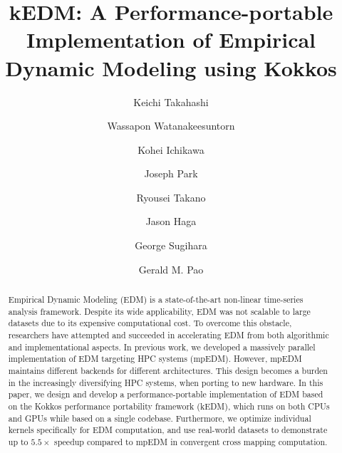 \documentclass[sigconf]{acmart}
\begin{document}

\title{kEDM: A Performance-portable Implementation of Empirical Dynamic
Modeling using Kokkos}

\author{Keichi Takahashi}
\author{Wassapon Watanakeesuntorn}
\author{Kohei Ichikawa}

\author{Joseph Park}

\author{Ryousei Takano}
\author{Jason Haga}

\author{George Sugihara}

\author{Gerald M. Pao}

\renewcommand{\shortauthors}{K. Takahashi et al.}

\begin{abstract}
    Empirical Dynamic Modeling (EDM) is a state-of-the-art non-linear time-series analysis framework. Despite its wide applicability, EDM was not
    scalable to large datasets due to its expensive computational cost. To
    overcome this obstacle, researchers have attempted and succeeded in accelerating EDM from
    both algorithmic and implementational aspects. In previous work, we
     developed a massively parallel implementation of EDM targeting
    HPC systems (mpEDM). However, mpEDM maintains different backends for different
    architectures. This design becomes a burden in the
    increasingly diversifying HPC systems, when porting to new hardware. In this paper, we design
    and develop a performance-portable implementation of EDM based on
    the Kokkos performance portability framework (kEDM), which runs on both CPUs and
    GPUs while based on a single codebase. Furthermore, we optimize individual kernels specifically for EDM computation, and use real-world datasets to demonstrate up to $5.5\times$ speedup compared to mpEDM
    in convergent cross mapping computation.
\end{abstract}
\end{document}
